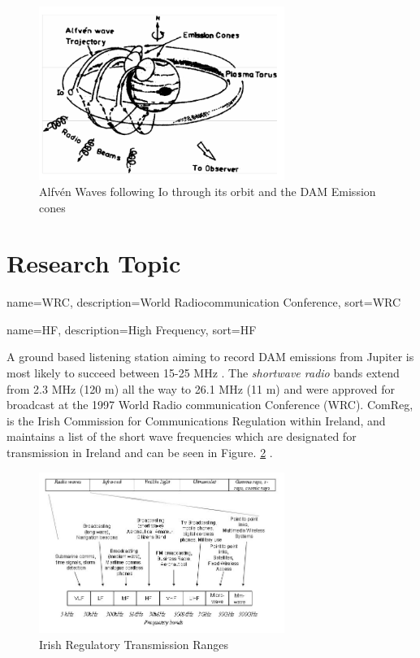 \documentclass[runningheads,a4paper]{llncs}
\begin{document}
%
\begin{figure}[here]
\centering
\includegraphics[width=8cm]{images/04}
\caption{Alfv\'en Waves following Io through its orbit and the DAM Emission cones \citep{bose08}}
\label{fig:io_plasma_torus}
\end{figure}
%

%
%
\newpage
\section*{Research Topic}
%

%
{
  name={WRC},
  description={World Radiocommunication Conference},
  sort=WRC
}
%

%
{
  name={HF},
  description={High Frequency},
  sort=HF
}
%

A ground based listening station aiming to record \gls{DAM} emissions from Jupiter is most likely to succeed between 15-25 MHz \citep{wilkinson94}. The \textit{shortwave radio} bands extend from 2.3 MHz (120 m) all the way to 26.1 MHz (11 m) and were approved for broadcast at the 1997 World Radio communication Conference (\gls{WRC}). ComReg, is the Irish Commission for Communications Regulation within Ireland, and maintains a list of the short wave frequencies which are designated for transmission in Ireland and can be seen in Figure. \ref{fig:irish_electromagnetic_transmission_ranges} \citep{comreg14}.

%
\begin{figure}[here]
\centering
\includegraphics[width=8cm]{images/06}
\caption{Irish Regulatory Transmission Ranges \citep{comreg14}}
\label{fig:irish_electromagnetic_transmission_ranges}
\end{figure}
%
\end{document}
